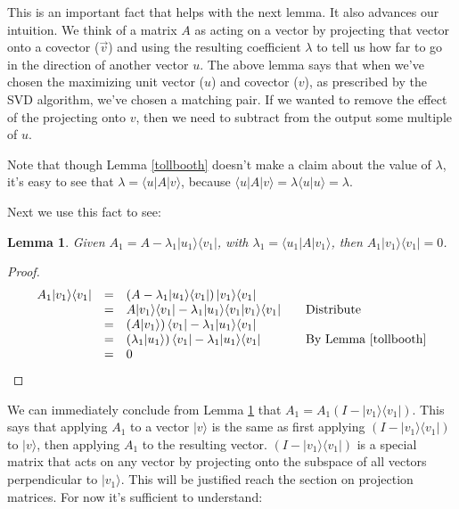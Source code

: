 \documentclass{amsbook}
\newtheorem{lemma}[theorem]{Lemma}
\begin{document}
This is an important fact that helps with the next lemma.  It also advances our intuition.  We think of a matrix $A$ as acting on a vector by projecting that vector onto a covector ($\vec v$) and using the resulting coefficient $\lambda$ to tell us how far to go in the direction of another vector $u$.  The above lemma says that when we've chosen the maximizing unit vector ($ u $) and covector ($ v $), as prescribed by the SVD algorithm, we've chosen a matching pair.  If we wanted to remove the effect of the projecting onto $ v $, then we need to subtract from the output some multiple of $ u $.

Note that though Lemma \ref{tollbooth} doesn't make a claim about the value of $\lambda$, it's easy to see that $\lambda=\langle u |A| v\rangle$, because $\langle u|A|v\rangle = \lambda\langle u|u\rangle = \lambda$.

Next we use this fact to see:

\begin{lemma}
\label{a1lemma}
Given $A_1=A-\lambda_1| u _1\rangle\langle v _1|$, with $\lambda_1=\langle u_1|A|v_1\rangle$, then $A_1| v _1\rangle\langle v _1|=0$.
\end{lemma}

\begin{proof}
$$
\begin{array}{rcll}
A_1| v _1\rangle\langle v _1| &=& \left(A-\lambda_1| u _1\rangle\langle v _1|\right)| v _1\rangle\langle v _1|& \\
&=& A| v _1\rangle\langle v _1| - \lambda_1| u _1\rangle\langle v _1| v _1\rangle\langle v _1| & \quad\text{Distribute}\\
&=& \left(A| v _1\rangle\right)\langle v _1| - \lambda_1| u _1\rangle\langle v _1|& \\
&=& \left(\lambda_1| u _1\rangle\right)\langle v _1| - \lambda_1| u _1\rangle\langle v _1|&\quad\text{By Lemma \ref{tollbooth}} \\
&=& 0
\end{array}
$$
\end{proof}

We can immediately conclude from Lemma \ref{a1lemma} that $A_1=A_1\left(I-| v _1\rangle\langle v _1|\right)$.  This says that applying $A_1$ to a vector $| v \rangle$ is the same as first applying $\left(I-| v _1\rangle\langle v _1|\right)$ to $| v \rangle$, then applying $A_1$ to the resulting vector.  $\left(I-| v _1\rangle\langle v _1|\right)$ is a special matrix that acts on any vector by projecting onto the subspace of all vectors perpendicular to $| v _1\rangle$.  This will be justified reach the section on projection matrices.  For now it's sufficient to understand:
\end{document}
